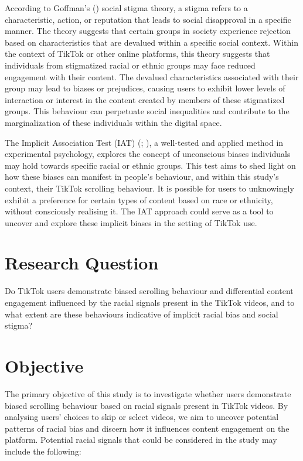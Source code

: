 \documentclass[a4paper, 12pt]{article}   %
\begin{document}
According to Goffman's (\citeyear{goffmanStigmaNotesManagement1963}) social stigma theory, a stigma refers to a characteristic, action, or reputation that leads to social disapproval in a specific manner.
The theory suggests that certain groups in society experience rejection based on characteristics that are devalued within a specific social context. Within the context of TikTok or other online platforms, this theory suggests that individuals from stigmatized racial or ethnic groups may face reduced engagement with their content. The devalued characteristics associated with their group may lead to biases or prejudices, causing users to exhibit lower levels of interaction or interest in the content created by members of these stigmatized groups. This behaviour can perpetuate social inequalities and contribute to the marginalization of these individuals within the digital space.

The Implicit Association Test (IAT) (\cite{GreenwaldAnthonyG1995ISCA}; \cite{GreenwaldAnthonyG1998MIDi}), a well-tested and applied method in experimental psychology, explores the concept of unconscious biases individuals may hold towards specific racial or ethnic groups. This test aims to shed light on how these biases can manifest in people's behaviour, and within this study's context,  their TikTok scrolling behaviour. It is possible for users to unknowingly exhibit a preference for certain types of content based on race or ethnicity, without consciously realising it. The IAT approach could serve as a tool to uncover and explore these implicit biases in the setting of TikTok use. 



\section*{Research Question}
 Do TikTok users demonstrate biased scrolling behaviour and differential content engagement influenced by the racial signals present in the TikTok videos, and to what extent are these behaviours indicative of implicit racial bias and social stigma?


\section*{Objective}
The primary objective of this study is to investigate whether users demonstrate biased scrolling behaviour based on racial signals present in TikTok videos. By analysing users' choices to skip or select videos, we aim to uncover potential patterns of racial bias and discern how it influences content engagement on the platform.
Potential racial signals that could be considered in the study may include the following:
\end{document}
